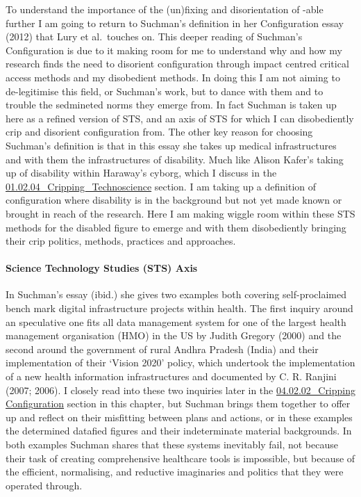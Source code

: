 To understand the importance of the (un)fixing and disorientation of
-able further I am going to return to Suchman's definition in her
Configuration essay (2012) that Lury et al.~touches on. This deeper
reading of Suchman's Configuration is due to it making room for me to
understand why and how my research finds the need to disorient
configuration through impact centred critical access methods and my
disobedient methods. In doing this I am not aiming to de-legitimise this
field, or Suchman's work, but to dance with them and to trouble the
sedmineted norms they emerge from. In fact Suchman is taken up here as a
refined version of STS, and an axis of STS for which I can disobediently
crip and disorient configuration from. The other key reason for choosing
Suchman's definition is that in this essay she takes up medical
infrastructures and with them the infrastructures of disability. Much
like Alison Kafer's taking up of disability within Haraway's cyborg,
which I discuss in the
\href{../../01_Disability_justice_and_life_affirmation_flipping_the_table/sections/01.02.04_Cripping_Technoscience.md}{01.02.04\_Cripping\_Technoscience}
section. I am taking up a definition of configuration where disability
is in the background but not yet made known or brought in reach of the
research. Here I am making wiggle room within these STS methods for the
disabled figure to emerge and with them disobediently bringing their
crip politics, methods, practices and approaches.

\hypertarget{science-technology-studies-sts-axis}{%
\paragraph{Science Technology Studies (STS)
Axis}\label{science-technology-studies-sts-axis}}

In Suchman's essay (ibid.) she gives two examples both covering
self-proclaimed bench mark digital infrastructure projects within
health. The first inquiry around an speculative one fits all data
management system for one of the largest health management organisation
(HMO) in the US by Judith Gregory (2000) and the second around the
government of rural Andhra Pradesh (India) and their implementation of
their `Vision 2020' policy, which undertook the implementation of a new
health information infrastructures and documented by C. R. Ranjini
(2007; 2006). I closely read into these two inquiries later in the
\href{04.02.02_Cripping\%20Configuration.md}{04.02.02\_Cripping
Configuration} section in this chapter, but Suchman brings them together
to offer up and reflect on their misfitting between plans and actions,
or in these examples the determined datafied figures and their
indeterminate material backgrounds. In both examples Suchman shares that
these systems inevitably fail, not because their task of creating
comprehensive healthcare tools is impossible, but because of the
efficient, normalising, and reductive imaginaries and politics that they
were operated through.

